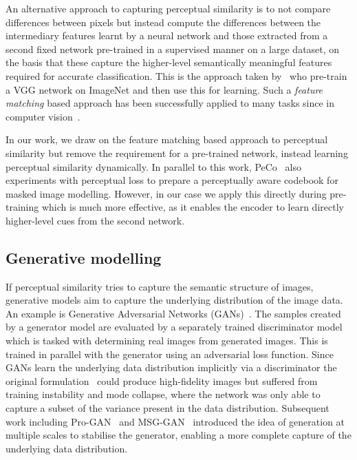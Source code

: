 \documentclass[10pt,twocolumn,letterpaper, cta-author]{article}
\begin{document}
An alternative approach to capturing perceptual similarity is to not compare differences between pixels but instead compute the differences between the intermediary features learnt by a neural network and those extracted from a second fixed network pre-trained in a supervised manner on a large dataset, on the basis that these capture the higher-level semantically meaningful features required for accurate classification. This is the approach taken by~\cite{Johnson2016Perceptual} who pre-train a VGG network on ImageNet and then use this for learning. Such a \textit{feature matching} based approach has been successfully applied to many tasks since in computer vision~\cite{9352486, wang2018pix2pixHD, wang2018esrgan}.

In our work, we draw on the feature matching based approach to perceptual similarity but remove the requirement for a pre-trained network, instead learning perceptual similarity dynamically. In parallel to this work, PeCo~\cite{dong2021peco} also experiments with perceptual loss to prepare a perceptually aware codebook for masked image modelling. However, in our case we apply this directly during pre-training which is much more effective, as it enables the encoder to learn directly higher-level cues from the second network.

\subsection{Generative modelling}

If perceptual similarity tries to capture the semantic structure of images, generative models aim to capture the underlying distribution of the image data. An example is Generative Adversarial Networks (GANs)~\cite{karnewar2019msg, Karras2020ada, progressive_gans, 9156570}. The samples created by a generator model are evaluated by a separately trained discriminator model which is tasked with determining real images from generated images. This is trained in parallel with the generator using an adversarial loss function. Since GANs learn the underlying data distribution implicitly via a discriminator the original formulation~\cite{NIPS2014_5ca3e9b1} could produce high-fidelity images but suffered from training instability and mode collapse, where the network was only able to capture a subset of the variance present in the data distribution. Subsequent work including Pro-GAN~\cite{progressive_gans} and MSG-GAN~\cite{karnewar2019msg} introduced the idea of generation at multiple scales to stabilise the generator, enabling a more complete capture of the underlying data distribution.
\end{document}
